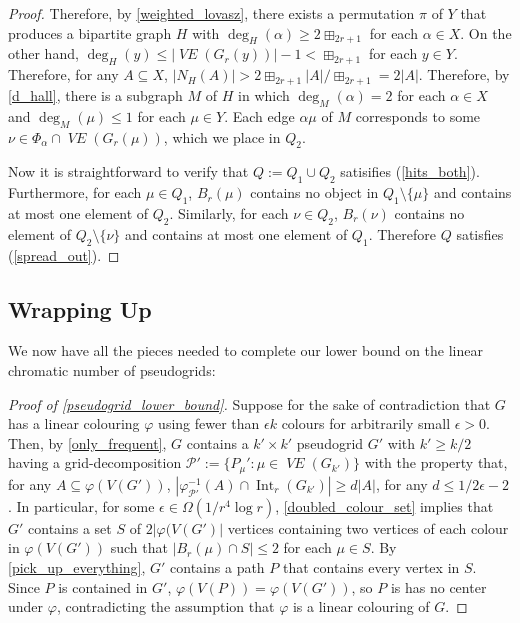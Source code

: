 \documentclass{patmorin}
\newcommand{\vol}[1]{\boxplus_{#1}}
\DeclareMathOperator{\interior}{Int}
\DeclareMathOperator{\VE}{\mathit{VE}}
\begin{document}
\begin{proof}
  Therefore, by \cref{weighted_lovasz}, there exists a permutation $\pi$ of $Y$ that produces a bipartite graph $H$ with $\deg_H(\alpha)\ge {2\vol{2r+1}}$ for each $\alpha\in X$.  On the other hand, $\deg_{H}(y)\le |\VE(G_r(y))|-1 < {\vol{2r+1}}$ for each $y\in Y$.  Therefore, for any $A\subseteq X$, $|N_H(A)|> {2\vol{2r+1}}|A|/{\vol{2r+1}} = 2|A|$.  Therefore, by \cref{d_hall}, there is a subgraph $M$ of $H$ in which $\deg_M(\alpha)=2$ for each $\alpha\in X$ and $\deg_M(\mu)\le 1$ for each $\mu\in Y$. Each edge $\alpha\mu$ of $M$ corresponds to some $\nu\in\Phi_\alpha\cap\VE(G_r(\mu))$, which we place in $Q_2$.

  Now it is straightforward to verify that $Q:=Q_1\cup Q_2$ satisifies (\ref{hits_both}).  Furthermore, for each $\mu\in Q_1$, $B_r(\mu)$ contains no object in $Q_1\setminus\{\mu\}$ and contains at most one element of $Q_2$.  Similarly, for each $\nu\in Q_2$, $B_r(\nu)$ contains no element of $Q_2\setminus\{\nu\}$ and contains at most one element of $Q_1$.  Therefore $Q$ satisfies (\ref{spread_out}).
\end{proof}

\subsection{Wrapping Up}
\label{wrapping_up}

We now have all the pieces needed to complete our lower bound on the linear chromatic number of pseudogrids:

\begin{proof}[Proof of \cref{pseudogrid_lower_bound}]
  Suppose for the sake of contradiction that $G$ has a linear colouring $\varphi$ using fewer than $\epsilon k$ colours for arbitrarily small $\epsilon >0$.  Then, by \cref{only_frequent}, $G$ contains a $k'\times k'$ pseudogrid $G'$ with $k'\ge k/2$ having a grid-decomposition $\mathcal{P}':=\{P_\mu':\mu\in \VE(G_{k'})\}$ with the property that, for any $A\subseteq\varphi(V(G'))$, $|\varphi^{-1}_{\mathcal{P'}}(A)\cap\interior_r(G_{k'})|\ge d|A|$, for any $d\le 1/2\epsilon-2$.  In particular, for some $\epsilon \in \Omega(1/r^4\log r)$, \cref{doubled_colour_set} implies that $G'$ contains a set $S$ of $2|\varphi(V(G')|$ vertices containing two vertices of each colour in $\varphi(V(G'))$ such that $|B_r(\mu)\cap S|\le 2$ for each $\mu\in S$.  By \cref{pick_up_everything}, $G'$ contains a path $P$ that contains every vertex in $S$.  Since $P$ is contained in $G'$, $\varphi(V(P))=\varphi(V(G'))$, so $P$ is has no center under $\varphi$, contradicting the assumption that $\varphi$ is a linear colouring of $G$.
\end{proof}
\end{document}
